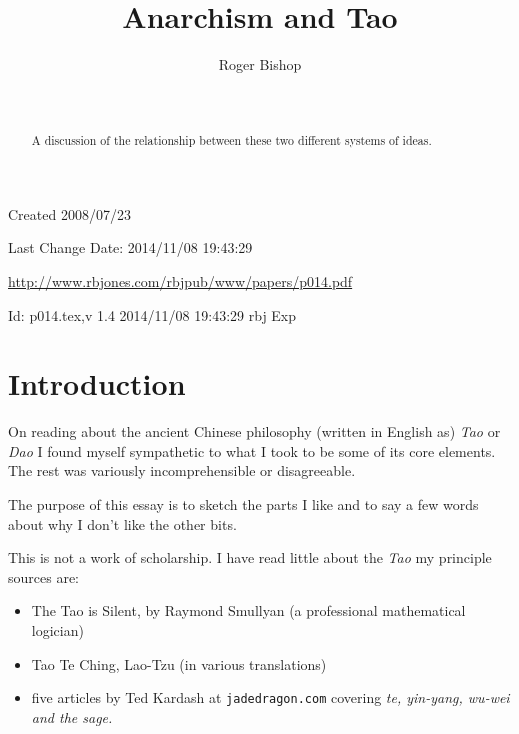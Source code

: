 \documentclass[numreferences]{rbjk}
\def\indexed#1{#1\index{#1}}
\begin{document}
                                                                                   
\begin{article}
\begin{opening}  
\title{Anarchism and Tao}
\author{Roger Bishop }
\date{$ $\ $ $}

\begin{abstract}
A discussion of the relationship between these two different systems of ideas.
\end{abstract}

\end{opening}

\vfill

\begin{centering}
\footnotesize{
Created 2008/07/23

Last Change $ $Date: 2014/11/08 19:43:29 $ $

\href{http://www.rbjones.com/rbjpub/www/papers/p014.pdf}{http://www.rbjones.com/rbjpub/www/papers/p014.pdf}

$ $Id: p014.tex,v 1.4 2014/11/08 19:43:29 rbj Exp $ $\\

}%
\end{centering}

\newpage
\setcounter{tocdepth}{4}
{\parskip-0pt\tableofcontents}

\section{Introduction}

On reading about the ancient Chinese philosophy (written in English as) {\it Tao} or {\it Dao} I found myself sympathetic to what I took to be some of its core elements.
The rest was variously incomprehensible or disagreeable.

The purpose of this essay is to sketch the parts I like and to say a few words about why I don't like the other bits.

This is not a work of scholarship.
I have read little about the {\it Tao} my principle sources are:

\begin{itemize}
\item The Tao is Silent\cite{smullyan77}, by Raymond Smullyan (a professional mathematical logician)
\item Tao Te Ching, Lao-Tzu (in various translations)
\item five articles by Ted Kardash at {\tt jadedragon.com} covering \indexed{\it te}, \indexed{\it yin-yang}, \indexed{\it wu-wei} and \indexed{\it the sage}. 
\end{itemize}


\end{article}
\end{document}
